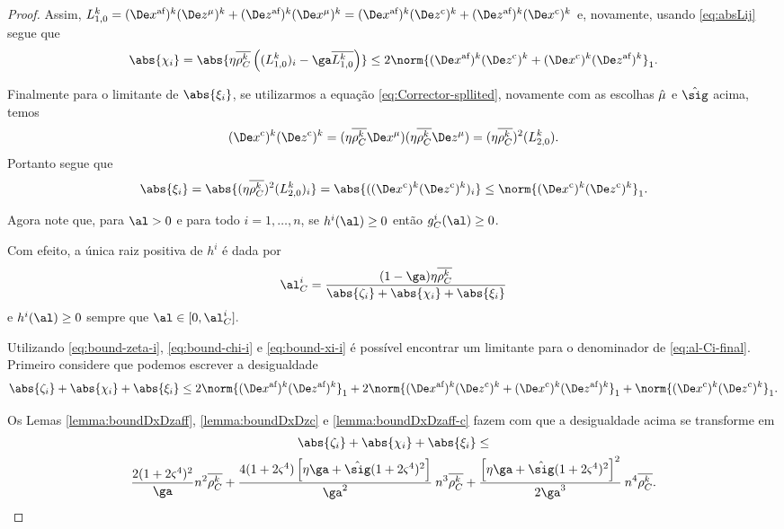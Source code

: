 \begin{proof}
	Assim, $ L_{1,0}^{k} = \dekx(\Dez^\mu)^{k} +
			\dekz(\Dex^\mu)^{k} = \dekx\Dekcoz +
			\dekz\Dekcox $ e, novamente, usando  \eqref{eq:absLij} segue que
\begin{equation}\label{eq:bound-chi-i}
	\abs{\chi_i } = \abs{\eta\rhoCkb  \left( ({L_{1,0}^{k}})_i - \ga\dbvec{L_{1,0}^{k}} \right)}  \leq 2 \norm{ \dekx \Dekcoz + \Dekcox \dekz }_1. %
\end{equation}

Finalmente para o limitante de $\abs{\xi_{i}}$, se utilizarmos  a equação \eqref{eq:Corrector-spllited}, novamente com as escolhas $\hat{\mu} $ e $\nextsig$ acima, temos
\[
	\Dekcox\Dekcoz = (\eta\rhoCkb \Dex^\mu)(\eta\rhoCkb \Dez^\mu) = (\eta\rhoCkb )^2(L_{2,0}^{k}).
\]
Portanto segue que
\begin{equation}\label{eq:bound-xi-i}
	\abs{\xi_i}	 =  \abs{(\eta\rhoCkb )^2(L_{2,0}^{k})_i}  = \abs{(\Dekcox\Dekcoz)_i} \leq \norm{\Dekcox\Dekcoz}_1.%
\end{equation}
	


Agora note que, para $\al>0$ e para todo $i=1,\ldots,n$, se $h^i(\al)\geq0$ então $g_C^i(\al)\geq 0$. 

Com efeito, a única raiz positiva de $h^i$ é dada por
\begin{equation}
	\label{eq:al-Ci-final}
	\al_{C}^i = \dfrac{(1-\ga)\eta\rhoCkb }{\abs{\zeta_i} + \abs{\chi_i} + \abs{\xi_i}}
\end{equation}
e $h^i(\al)\geq 0$ sempre que $\al\in[0,\al_{C}^i].$ 



Utilizando \eqref{eq:bound-zeta-i}, \eqref{eq:bound-chi-i} e \eqref{eq:bound-xi-i}  é possível encontrar um limitante para o denominador de \eqref{eq:al-Ci-final}. Primeiro considere que podemos escrever a  
desigualdade
\[
\abs{\zeta_i} + \abs{\chi_i} + \abs{\xi_i} \leq 2\norm{ \dekx  \dekz }_1 + 2 \norm{ \dekx \Dekcoz + \Dekcox \dekz }_1 + \norm{\Dekcox\Dekcoz}_1.
\]



Os Lemas \ref{lemma:boundDxDzaff},   \ref{lemma:boundDxDzc} e \ref{lemma:boundDxDzaff-c}  fazem com que a desigualdade acima se transforme em 
\begin{multline*}
\abs{\zeta_i} + \abs{\chi_i}  + \abs{\xi_i}  \leq \\  \frac{2(1 + 2\bdxzstar^{4})^{2} }{\ga} n^{2}\rhoCkb + 
												\dfrac{4(1+2\bdxzstar^{4})\left[\eta\ga + \nextsig(1+2\bdxzstar^{4})^{2}\right]}{\ga^{2}}\: n^{3}\rhoCkb + 	 \dfrac{\left[\eta\ga + \nextsig(1+2\bdxzstar^{4})^{2}\right]^{2}}{2\ga^{3}} \: n^{4}\rhoCkb.
\end{multline*}


\end{proof}
